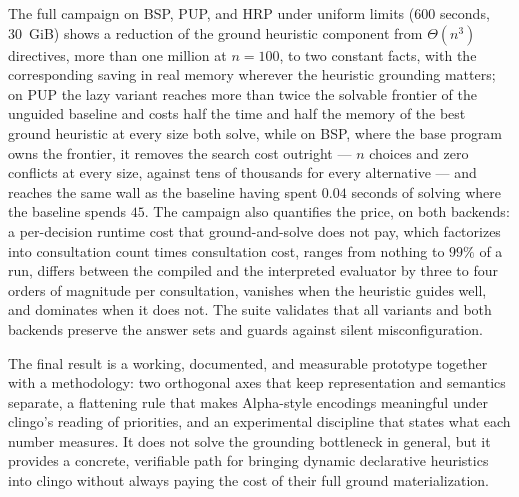 The full campaign on BSP, PUP, and HRP under uniform limits (600 seconds, 30~GiB) shows a reduction of the ground heuristic component from $\Theta(n^3)$ directives, more than one million at $n=100$, to two constant facts, with the corresponding saving in real memory wherever the heuristic grounding matters; on PUP the lazy variant reaches more than twice the solvable frontier of the unguided baseline and costs half the time and half the memory of the best ground heuristic at every size both solve, while on BSP, where the base program owns the frontier, it removes the search cost outright --- $n$ choices and zero conflicts at every size, against tens of thousands for every alternative --- and reaches the same wall as the baseline having spent $0.04$ seconds of solving where the baseline spends $45$. The campaign also quantifies the price, on both backends: a per-decision runtime cost that ground-and-solve does not pay, which factorizes into consultation count times consultation cost, ranges from nothing to $99\%$ of a run, differs between the compiled and the interpreted evaluator by three to four orders of magnitude per consultation, vanishes when the heuristic guides well, and dominates when it does not. The suite validates that all variants and both backends preserve the answer sets and guards against silent misconfiguration.

The final result is a working, documented, and measurable prototype together with a methodology: two orthogonal axes that keep representation and semantics separate, a flattening rule that makes Alpha-style encodings meaningful under clingo's reading of priorities, and an experimental discipline that states what each number measures. It does not solve the grounding bottleneck in general, but it provides a concrete, verifiable path for bringing dynamic declarative heuristics into clingo without always paying the cost of their full ground materialization.
